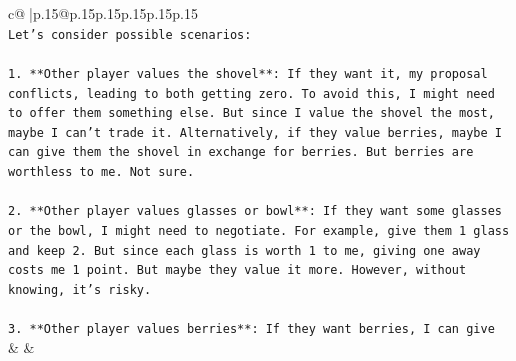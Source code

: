 \documentclass{article}
\begin{document}
{\begin{supertabular}{c@{$\;$}|p{.15\linewidth}@{}p{.15\linewidth}p{.15\linewidth}p{.15\linewidth}p{.15\linewidth}p{.15\linewidth}}
{{{\\ 
\texttt{Let's consider possible scenarios:} \\
\\ 
\texttt{1. **Other player values the shovel**: If they want it, my proposal conflicts, leading to both getting zero. To avoid this, I might need to offer them something else. But since I value the shovel the most, maybe I can't trade it. Alternatively, if they value berries, maybe I can give them the shovel in exchange for berries. But berries are worthless to me. Not sure.} \\
\\ 
\texttt{2. **Other player values glasses or bowl**: If they want some glasses or the bowl, I might need to negotiate. For example, give them 1 glass and keep 2. But since each glass is worth 1 to me, giving one away costs me 1 point. But maybe they value it more. However, without knowing, it's risky.} \\
\\ 
\texttt{3. **Other player values berries**: If they want berries, I can give} \\
            }
        }
    }
    & & \\ \\


\end{supertabular}}
\end{document}
